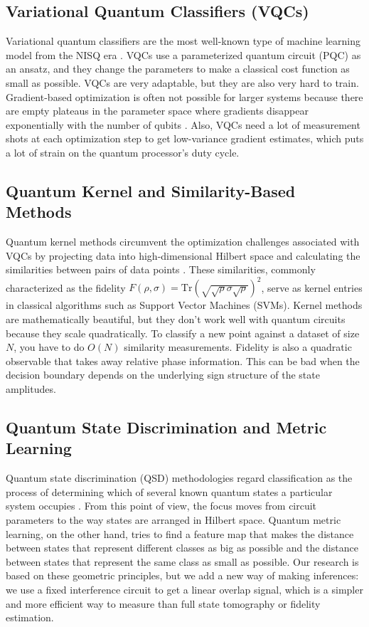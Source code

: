 \documentclass[conference]{IEEEtran}
\begin{document}
\subsection{Variational Quantum Classifiers (VQCs)}

Variational quantum classifiers are the most well-known type of machine learning model from the NISQ era \cite{benedetti2019parameterized,abbas2021power}. VQCs use a parameterized quantum circuit (PQC) as an ansatz, and they change the parameters to make a classical cost function as small as possible. VQCs are very adaptable, but they are also very hard to train. Gradient-based optimization is often not possible for larger systems because there are empty plateaus in the parameter space where gradients disappear exponentially with the number of qubits \cite{mcclean2018barren}. Also, VQCs need a lot of measurement shots at each optimization step to get low-variance gradient estimates, which puts a lot of strain on the quantum processor's duty cycle.

\subsection{Quantum Kernel and Similarity-Based Methods}

Quantum kernel methods circumvent the optimization challenges associated with VQCs by projecting data into high-dimensional Hilbert space and calculating the similarities between pairs of data points \cite{schuld2019feature,havlicek2019supervised}. These similarities, commonly characterized as the fidelity $F(\rho, \sigma) = \text{Tr}(\sqrt{\sqrt{\rho}\sigma\sqrt{\rho}})^2$, serve as kernel entries in classical algorithms such as Support Vector Machines (SVMs). Kernel methods are mathematically beautiful, but they don't work well with quantum circuits because they scale quadratically. To classify a new point against a dataset of size $N$, you have to do $O(N)$ similarity measurements. Fidelity is also a quadratic observable that takes away relative phase information. This can be bad when the decision boundary depends on the underlying sign structure of the state amplitudes.

\subsection{Quantum State Discrimination and Metric Learning}

Quantum state discrimination (QSD) methodologies regard classification as the process of determining which of several known quantum states a particular system occupies \cite{sergioli2019binary,gonzalez2021classification}. From this point of view, the focus moves from circuit parameters to the way states are arranged in Hilbert space. Quantum metric learning, on the other hand, tries to find a feature map that makes the distance between states that represent different classes as big as possible and the distance between states that represent the same class as small as possible. Our research is based on these geometric principles, but we add a new way of making inferences: we use a fixed interference circuit to get a linear overlap signal, which is a simpler and more efficient way to measure than full state tomography or fidelity estimation.
\end{document}
